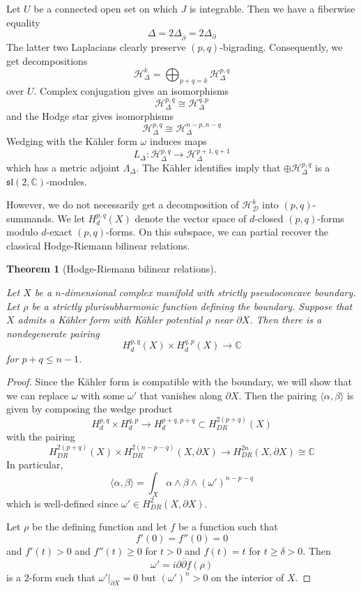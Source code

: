 \documentclass[11pt]{amsart}
\newtheorem{theorem}{Theorem}[section]
\theoremstyle{definition}
\theoremstyle{remark}
\numberwithin{equation}{section}
\newcommand{\cH}{\mathcal{H}}
\newcommand{\dbar}{\overline{\del}}
\newcommand{\cD}{\mathcal{D}}
\newcommand{\CC}{\mathbb{C}}
\newcommand{\del}{\partial}
\begin{document}
Let $U$ be a connected open set on which $J$ is integrable.  Then we have a fiberwise equality
\[\Delta = 2 \Delta_{\dbar} = 2 \Delta_{\del}\]
The latter two Laplacians clearly preserve $(p,q)$-bigrading.  Consequently, we get decompositions
\[\cH^k_{\Delta} = \bigoplus_{p+q = k} \cH^{p,q}_{\Delta} \]
over $U$.  Complex conjugation gives an isomorphisms
\[\cH^{p,q}_{\Delta} \cong \cH^{q,p}_{\Delta}\]
and the Hodge star gives isomorphisms
\[\cH^{p,q}_{\Delta} \cong \cH^{n-p,n-q}_{\Delta} \]
Wedging with the K\"ahler form $\omega$ induces maps
\[ L_{\Delta}: \cH^{p,q}_{\Delta} \rightarrow \cH^{p+1,q+1}_{\Delta} \]
which has a metric adjoint $\Lambda_{\Delta}$.  The K\"ahler identifies imply that $\oplus \cH^{p,q}_{\Delta}$ is a $\mathfrak{sl}(2,\CC)$-modules.

However, we do not necessarily get a decomposition of $\cH^k_{\cD}$ into $(p,q)$-summands.  We let $H^{p,q}_d(X)$ denote the vector space of $d$-closed $(p,q)$-forms modulo $d$-exact $(p,q)$-forms.  On this subspace, we can partial recover the classical Hodge-Riemann bilinear relations.

\begin{theorem}[Hodge-Riemann bilinear relations]
\label{thrm:Hodge-Riemann}

Let $X$ be a $n$-dimensional complex manifold with strictly pseudoconcave boundary.  Let $\rho$ be a strictly plurisubharmonic function defining the boundary.  Suppose that $X$ admits a K\"ahler form with K\"ahler potential $\rho$ near $\partial X$.  Then there is a nondegenerate pairing
\[H^{p,q}_d(X) \times H^{q,p}_d(X) \rightarrow \CC\]
for $p+q \leq n-1$.    
\end{theorem}

\begin{proof}
Since the K\"ahler form is compatible with the boundary, we will show that we can replace $\omega$ with some $\omega'$ that vanishes along $\partial X$.  Then the pairing $\langle \alpha, \beta \rangle$ is given by composing the wedge product
\[H^{p,q}_d \times H^{q,p}_d \rightarrow H^{p+q,p+q}_d \subset H^{2(p + q)}_{DR}(X)\]
with the pairing
\[H^{2(p + q)}_{DR}(X) \times H^{2(n - p -q)}_{DR}(X,\partial X) \rightarrow H^{2n}_{DR}(X,\partial X) \cong \CC\]
In particular,
\[\langle \alpha, \beta \rangle = \int_{X} \alpha \wedge \beta \wedge (\omega')^{n-p-q}\]
which is well-defined since $\omega' \in H^2_{DR}(X,\partial X)$.

Let $\rho$ be the defining function and let $f$ be a function such that
\[f'(0) = f''(0) = 0\]
and $f'(t) > 0$ and $f''(t) \geq 0$ for $t > 0$ and $f(t) = t$ for $t \geq  \delta > 0$.  Then
\[ \omega' = i \del \dbar f(\rho)\]
is a 2-form such that $\omega'|_{\partial X} = 0$ but $(\omega')^n > 0$ on the interior of $X$.
\end{proof}
\end{document}

